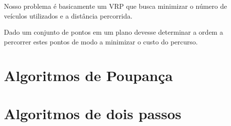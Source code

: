 \documentclass[a4paper,12pt]{book}
\begin{document}
	Nosso problema é basicamente um VRP que busca minimizar o número de veículos utilizados e a
distância percorrida.



	Dado um conjunto de pontos em um plano devesse determinar a ordem a percorrer estes pontos de
modo a minimizar o custo do percurso.



\chapter{Algoritmos de Poupança}




\chapter{Algoritmos de dois passos}

\end{document}
